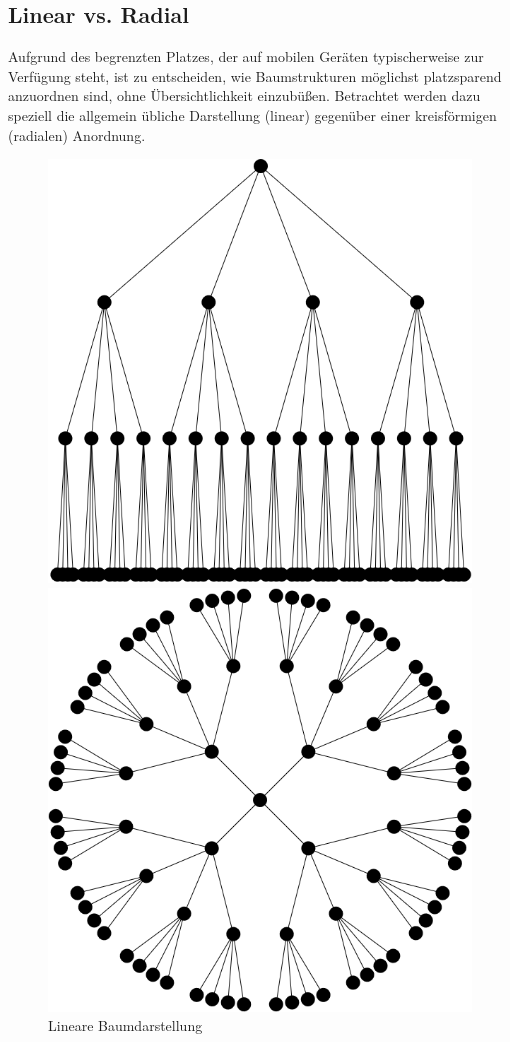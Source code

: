 \subsection{Linear vs. Radial}\label{sec:radial}
Aufgrund des begrenzten Platzes, der auf mobilen Geräten typischerweise zur Verfügung steht, ist zu entscheiden, wie Baumstrukturen möglichst platzsparend anzuordnen sind, ohne Übersichtlichkeit einzubüßen. Betrachtet werden dazu speziell die allgemein übliche Darstellung (linear) gegenüber einer kreisförmigen (radialen) Anordnung.\\
\begin{figure}
	\centering
	\begin{minipage}{.5\textwidth}
		\centering
		\includegraphics[width=.9\linewidth]{../screenshots/lineargraphexample.PNG}
		\caption{Lineare Baumdarstellung}
		\label{abb:linearbaum}
	\end{minipage}%
	\begin{minipage}{.5\textwidth}
		\centering
		\includegraphics[width=.9\linewidth]{../screenshots/radialgraphexample.PNG}

\end{minipage}
\end{figure}
